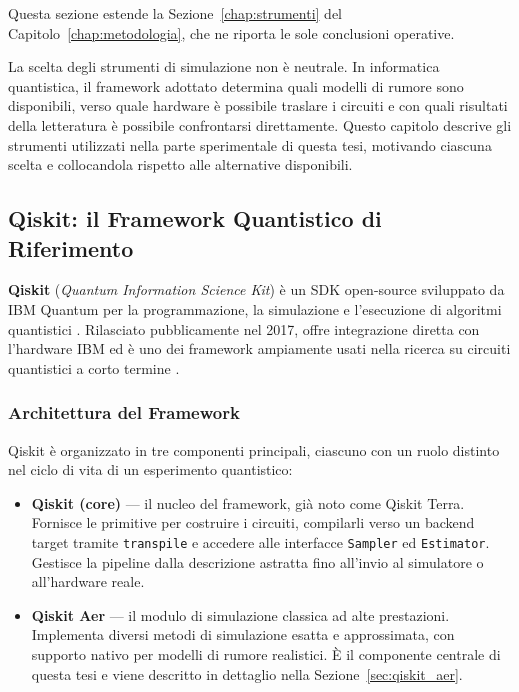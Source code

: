 \begin{onehalfspace}

Questa sezione estende la Sezione~\ref{chap:strumenti} del
Capitolo~\ref{chap:metodologia}, che ne riporta le sole conclusioni operative.

La scelta degli strumenti di simulazione non è neutrale. In informatica quantistica, il framework adottato determina quali modelli di rumore sono disponibili, verso quale hardware è possibile traslare i circuiti e con quali risultati della letteratura è possibile confrontarsi direttamente. Questo capitolo descrive gli strumenti utilizzati nella parte sperimentale di questa tesi, motivando ciascuna scelta e collocandola rispetto alle alternative disponibili.

\subsection{Qiskit: il Framework Quantistico di Riferimento}
\label{sec:qiskit}

\textbf{Qiskit} (\textit{Quantum Information Science Kit}) è un \ac{SDK} open-source sviluppato da \ac{IBM} Quantum per la programmazione, la simulazione e l'esecuzione di algoritmi quantistici \cite{qiskit2023}. Rilasciato pubblicamente nel 2017, offre integrazione diretta con l'hardware \ac{IBM} ed è uno dei framework ampiamente usati nella ricerca su circuiti quantistici a corto termine \cite{skosana2021, shor_hpec2023}.

\subsubsection{Architettura del Framework}

Qiskit è organizzato in tre componenti principali, ciascuno con un ruolo distinto nel ciclo di vita di un esperimento quantistico:

\begin{itemize}

    \item \textbf{Qiskit (core)} — il nucleo del framework, già noto come Qiskit Terra. Fornisce le primitive per costruire i circuiti, compilarli verso un backend target tramite \texttt{transpile} e accedere alle interfacce \texttt{Sampler} ed \texttt{Estimator}. Gestisce la pipeline dalla descrizione astratta fino all'invio al simulatore o all'hardware reale.

    \item \textbf{Qiskit Aer} — il modulo di simulazione classica ad alte prestazioni. Implementa diversi metodi di simulazione esatta e approssimata, con supporto nativo per modelli di rumore realistici. È il componente centrale di questa tesi e viene descritto in dettaglio nella Sezione~\ref{sec:qiskit_aer}.


\end{itemize}
\end{onehalfspace}
